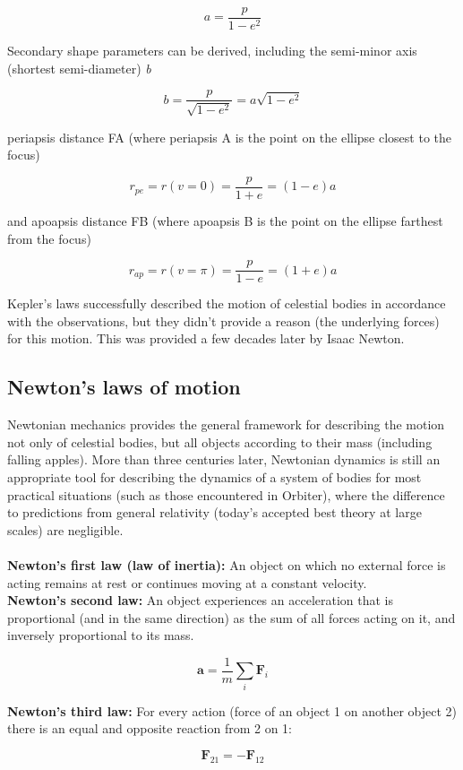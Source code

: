 \documentclass[Orbiter User Manual.tex]{subfiles}
\begin{document}
\[ a = \frac{p}{1 - e^{2}} \]

\noindent
Secondary shape parameters can be derived, including the semi-minor axis (shortest semi-diameter) \textit{b}

\[ b = \frac{p}{\sqrt{1 - e^{2}}} = a \sqrt{1 - e^{2}} \]

\noindent
periapsis distance FA (where periapsis A is the point on the ellipse closest to the focus)

\[ r_{pe} = r(v=0) = \frac{p}{1 + e} = (1 - e) a \]

\noindent
and apoapsis distance FB (where apoapsis B is the point on the ellipse farthest from the focus)

\[ r_{ap} = r(v=\pi) = \frac{p}{1 - e} = (1 + e) a \]

\noindent
Kepler's laws successfully described the motion of celestial bodies in accordance with the observations, but they didn't provide a reason (the underlying forces) for this motion. This was provided a few decades later by Isaac Newton.

\subsection{Newton's laws of motion}
Newtonian mechanics provides the general framework for describing the motion not only of celestial bodies, but all objects according to their mass (including falling apples). More than three centuries later, Newtonian dynamics is still an appropriate tool for describing the dynamics of a system of bodies for most practical situations (such as those encountered in Orbiter), where the difference to predictions from general relativity (today's accepted best theory at large scales) are negligible.\\
\\
\textbf{Newton's first law (law of inertia):} An object on which no external force is acting remains at rest or continues moving at a constant velocity.\\
\textbf{Newton's second law:} An object experiences an acceleration that is proportional (and in the same direction) as the sum of all forces acting on it, and inversely proportional to its mass.

\[ \textbf{a} = \frac{1}{m} \sum_{i} \textbf{F}_{i} \]

\noindent
\textbf{Newton's third law:} For every action (force of an object 1 on another object 2) there is an equal and opposite reaction from 2 on 1:

\[ \textbf{F}_{21} = - \textbf{F}_{12} \]
\end{document}
